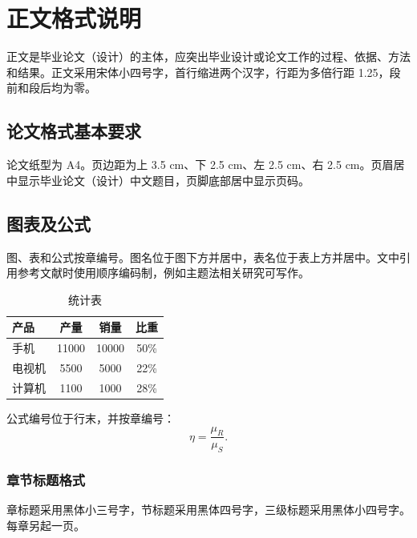 
\chapter{正文格式说明}

正文是毕业论文（设计）的主体，应突出毕业设计或论文工作的过程、依据、方法和结果。正文采用宋体小四号字，首行缩进两个汉字，行距为多倍行距 1.25，段前和段后均为零。

\section{论文格式基本要求}

论文纸型为 A4。页边距为上 3.5 cm、下 2.5 cm、左 2.5 cm、右 2.5 cm。页眉居中显示毕业论文（设计）中文题目，页脚底部居中显示页码。

\section{图表及公式}

图、表和公式按章编号。图名位于图下方并居中，表名位于表上方并居中。文中引用参考文献时使用顺序编码制，例如主题法相关研究可写作。

\begin{table}[H]
  \centering
  \caption{统计表}
  \begin{tabular}{lccc}
    \toprule
    产品 & 产量 & 销量 & 比重 \\
    \midrule
    手机 & 11000 & 10000 & 50\% \\
    电视机 & 5500 & 5000 & 22\% \\
    计算机 & 1100 & 1000 & 28\% \\
    \bottomrule
  \end{tabular}
\end{table}

公式编号位于行末，并按章编号：
\begin{equation}
  \eta = \frac{\mu_R}{\mu_S}.
\end{equation}

\subsection{章节标题格式}

章标题采用黑体小三号字，节标题采用黑体四号字，三级标题采用黑体小四号字。每章另起一页。
